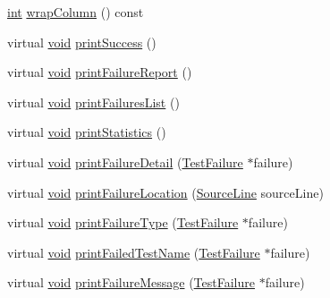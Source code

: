 \begin{DoxyCompactItemize}
\item 
\hyperlink{wglew_8h_a500a82aecba06f4550f6849b8099ca21}{int} \hyperlink{class_compiler_outputter_a44a670371d545db99603ce88b59aa6c0}{wrap\-Column} () const 
\item 
virtual \hyperlink{wglew_8h_aeea6e3dfae3acf232096f57d2d57f084}{void} \hyperlink{class_compiler_outputter_a5fb16745d10fddb67cbcbec270218589}{print\-Success} ()
\item 
virtual \hyperlink{wglew_8h_aeea6e3dfae3acf232096f57d2d57f084}{void} \hyperlink{class_compiler_outputter_ab277e9b8c4af074593904dbc00853561}{print\-Failure\-Report} ()
\item 
virtual \hyperlink{wglew_8h_aeea6e3dfae3acf232096f57d2d57f084}{void} \hyperlink{class_compiler_outputter_a6919d4e1d44d03e50694aee73dc96d89}{print\-Failures\-List} ()
\item 
virtual \hyperlink{wglew_8h_aeea6e3dfae3acf232096f57d2d57f084}{void} \hyperlink{class_compiler_outputter_acc3eefc4776b975af3502ef9afaf8b3d}{print\-Statistics} ()
\item 
virtual \hyperlink{wglew_8h_aeea6e3dfae3acf232096f57d2d57f084}{void} \hyperlink{class_compiler_outputter_a2a8fece8722cb0307a5f0f6cd0de41c3}{print\-Failure\-Detail} (\hyperlink{class_test_failure}{Test\-Failure} $\ast$failure)
\item 
virtual \hyperlink{wglew_8h_aeea6e3dfae3acf232096f57d2d57f084}{void} \hyperlink{class_compiler_outputter_aac88928b23fbae0b33b1624fa5696c31}{print\-Failure\-Location} (\hyperlink{class_source_line}{Source\-Line} source\-Line)
\item 
virtual \hyperlink{wglew_8h_aeea6e3dfae3acf232096f57d2d57f084}{void} \hyperlink{class_compiler_outputter_ae836af9e969ced1ebdb399313df10250}{print\-Failure\-Type} (\hyperlink{class_test_failure}{Test\-Failure} $\ast$failure)
\item 
virtual \hyperlink{wglew_8h_aeea6e3dfae3acf232096f57d2d57f084}{void} \hyperlink{class_compiler_outputter_a3e3fc6d7f2e98161144ab02f5f42dd9b}{print\-Failed\-Test\-Name} (\hyperlink{class_test_failure}{Test\-Failure} $\ast$failure)
\item 
virtual \hyperlink{wglew_8h_aeea6e3dfae3acf232096f57d2d57f084}{void} \hyperlink{class_compiler_outputter_a701ad438ff6a5a0af01acd1d43de4b6c}{print\-Failure\-Message} (\hyperlink{class_test_failure}{Test\-Failure} $\ast$failure)
\end{DoxyCompactItemize}

